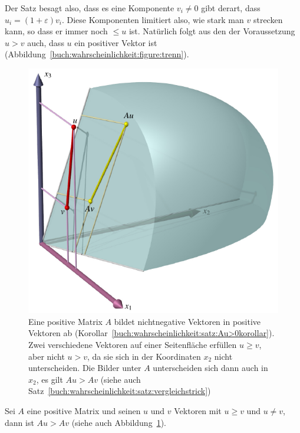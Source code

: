 Der Satz besagt also, dass es eine Komponente $v_i\ne 0$ gibt
derart, dass $u_i = (1+\varepsilon)v_i$.
Diese Komponenten limitiert also, wie stark man $v$ strecken kann,
so dass er immer noch $\le u$ ist.
Natürlich folgt aus den der Voraussetzung $u>v$ auch, dass $u$ ein 
positiver Vektor ist (Abbildung~\ref{buch:wahrscheinlichkeit:figure:trenn}).

\begin{figure}
\centering
\includegraphics{chapters/80-wahrscheinlichkeit/images/vergleich.pdf}
\caption{Eine positive Matrix $A$ bildet nichtnegative Vektoren in
positive Vektoren ab
(Korollar~\ref{buch:wahrscheinlichkeit:satz:Au>0korollar}).
Zwei verschiedene Vektoren auf einer Seitenfläche erfüllen $u\ge v$,
aber nicht $u>v$, da sie sich in der Koordinaten $x_2$ nicht unterscheiden.
Die Bilder unter $A$ unterscheiden sich dann auch in $x_2$, es gilt
$Au>Av$ (siehe auch Satz~\ref{buch:wahrscheinlichkeit:satz:vergleichstrick})
\label{buch:wahrscheinlichkeit:fig:vergleich}}
\end{figure}

\begin{satz}[Vergleichstrick]
\label{buch:wahrscheinlichkeit:satz:vergleichstrick}
Sei $A$ eine positive Matrix und seinen $u$ und $v$ Vektoren
mit $u\ge v$ und $u\ne v$, dann ist $Au > Av$
(siehe auch Abbildung~\ref{buch:wahrscheinlichkeit:fig:vergleich}).
\end{satz}

